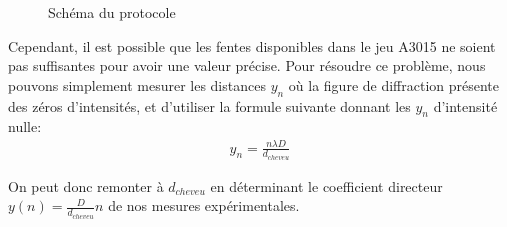 \documentclass[12pt]{article}
\begin{document}
\begin{figure}[!h]
    \begin{center}
        \resizebox{0.7\textwidth}{8cm}{
        
        }
    \end{center}
    \caption{Schéma du protocole}
\end{figure}

Cependant, il est possible que les fentes disponibles dans le jeu A3015 ne soient pas suffisantes pour avoir une valeur précise. Pour résoudre ce problème, nous pouvons
simplement mesurer les distances $y_n$ où la figure de diffraction présente des zéros d'intensités, et d'utiliser la formule suivante donnant les $y_n$ d'intensité nulle:
\begin{align}
    y_n = \frac{n\lambda D}{d_{cheveu}}
\end{align}

On peut donc remonter à $d_{cheveu}$ en déterminant le coefficient directeur $y(n) = \frac{D}{d_{cheveu}} n$ de nos mesures expérimentales.



\newpage
\end{document}
